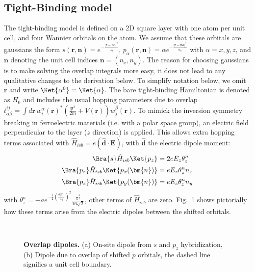 \subsection{Tight-Binding model}
The tight-binding model is defined on a 2D square layer with one atom per unit cell, and four Wannier orbitals on the atom. We assume that these orbitals are gaussians the form $s(\bm{r}, \bm{n}) = e^{-\frac{|\bm{r}-\bm{n}a|^2}{a_0}}$, $p_\alpha(\bm{r}, \bm{n}) = \alpha e^{-\frac{|\bm{r}-\bm{n}a|^2}{a_0}}$ with $\alpha = x, y, z$, and $\bm{n}$ denoting the unit cell indices $\bm{n} = (n_x, n_y)$.
The reason for choosing gaussians is to make solving the overlap integrals more easy, it does not lead to any qualitative changes to the derivation below.
To simplify notation below, we omit $\bm{r}$ and write $\Ket{\alpha^0} = \Ket{\alpha}$.
The bare tight-binding Hamiltonian is denoted as $\hat{H}_0$ and includes the usual hopping parameters due to overlap $t_{\alpha\beta}^{ij} = \int d\mathbf{r} \,w^{\alpha}_i(\mathbf{r})^*(\frac{\mathbf{p}^2}{2m} + V(\bm{r}))w^{\beta}_j(\mathbf{r})$.
To mimick the inversion symmetry breaking in ferroelectric materials (i.e. with a polar space group), an electric field perpendicular to the layer ($z$ direction) is applied.
This allows extra hopping terms associated with $\hat{H}_{isb} = e (\hat{\bm{d}}\cdot \bm{E})$, with $\hat{\bm{d}}$ the electric dipole moment:
\begin{align}
	\label{eq:dipole}
	\Bra{s} \hat{H}_{isb} \Ket{p_z} &= 2 e E_z \theta_z^n\\
	\Bra{p_z} \hat{H}_{isb} \Ket{p_x(\bm{n})} &= e E_z \theta_z^n n_x\\
	\Bra{p_z} \hat{H}_{isb} \Ket{p_y(\bm{n})} &= e E_z \theta_z^n n_y
\end{align}
with $\theta_z^n = -ae^{-\frac{1}{2}\left(\frac{a|\bm{n}|}{a_0}\right)^2}\frac{\pi^{\frac{3}{2}}}{16\sqrt{2}}$, other terms of $\hat{H}_{isb}$ are zero.
Fig.~\ref{fig:overlapdip} shows pictorially how these terms arise from the electric dipoles between the shifted orbitals. 
\begin{figure}[t]
~\centering
{}\caption{\label{fig:overlapdip} {\bf Overlap dipoles.} (a) On-site dipole from $s$ and $p_z$ hybridization, (b) Dipole due to overlap of shifted $p$ orbitals, the dashed line signifies a unit cell boundary.}
\end{figure}

